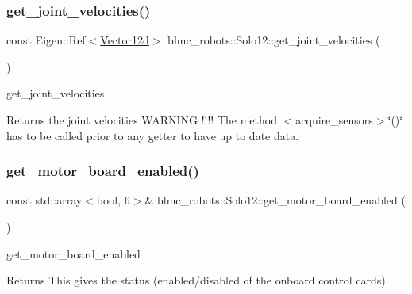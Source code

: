 \subsubsection{\texorpdfstring{get\+\_\+joint\+\_\+velocities()}{get\_joint\_velocities()}}
{\footnotesize\ttfamily const Eigen\+::\+Ref$<$\hyperlink{common__header_8hpp_a80313eb420184518596e745eecf4b494}{Vector12d}$>$ blmc\+\_\+robots\+::\+Solo12\+::get\+\_\+joint\+\_\+velocities (\begin{DoxyParamCaption}{ }\end{DoxyParamCaption})\hspace{0.3cm}{\ttfamily [inline]}}



get\+\_\+joint\+\_\+velocities 

\begin{DoxyReturn}{Returns}
the joint velocities W\+A\+R\+N\+I\+NG !!!! The method $<$acquire\+\_\+sensors$>$\char`\"{}()\char`\"{} has to be called prior to any getter to have up to date data. 
\end{DoxyReturn}
\mbox{\label{classblmc__robots_1_1Solo12_af9265895ea76870eeeec913cb6794806}} 
\subsubsection{\texorpdfstring{get\+\_\+motor\+\_\+board\+\_\+enabled()}{get\_motor\_board\_enabled()}}
{\footnotesize\ttfamily const std\+::array$<$bool, 6$>$\& blmc\+\_\+robots\+::\+Solo12\+::get\+\_\+motor\+\_\+board\+\_\+enabled (\begin{DoxyParamCaption}{ }\end{DoxyParamCaption})\hspace{0.3cm}{\ttfamily [inline]}}



get\+\_\+motor\+\_\+board\+\_\+enabled 

\begin{DoxyReturn}{Returns}
This gives the status (enabled/disabled of the onboard control cards). 
\end{DoxyReturn}
\mbox{\label{classblmc__robots_1_1Solo12_aac115dccae0a43c10ace81a348f86182}} 
